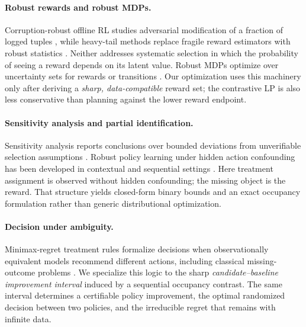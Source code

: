 \documentclass[letterpaper]{article}
\theoremstyle{remark}
\begin{document}
\paragraph{Robust rewards and robust MDPs.}
Corruption-robust offline RL studies adversarial modification of a fraction of logged tuples \citep{zhang2022corruption}, while heavy-tail methods replace fragile reward estimators with robust statistics \citep{zhu2024heavy}. Neither addresses systematic selection in which the probability of seeing a reward depends on its latent value. Robust MDPs optimize over uncertainty sets for rewards or transitions \citep{iyengar2005robust,nilim2005robust,wiesemann2013robust}. Our optimization uses this machinery only after deriving a \emph{sharp, data-compatible} reward set; the contrastive LP is also less conservative than planning against the lower reward endpoint.

\paragraph{Sensitivity analysis and partial identification.}
Sensitivity analysis reports conclusions over bounded deviations from unverifiable selection assumptions \citep{rosenbaum2002observational,manski2003partial}. Robust policy learning under hidden action confounding has been developed in contextual and sequential settings \citep{kallus2018confounding,kallus2020confounding,jin2025policy,hess2026sharp}. Here treatment assignment is observed without hidden confounding; the missing object is the reward. That structure yields closed-form binary bounds and an exact occupancy formulation rather than generic distributional optimization.

\paragraph{Decision under ambiguity.}
Minimax-regret treatment rules formalize decisions when observationally equivalent models recommend different actions, including classical missing-outcome problems \citep{manski2007missing,manski2009diversified,stoye2012minimax}. We specialize this logic to the sharp \emph{candidate--baseline improvement interval} induced by a sequential occupancy contrast. The same interval determines a certifiable policy improvement, the optimal randomized decision between two policies, and the irreducible regret that remains with infinite data.
\end{document}
